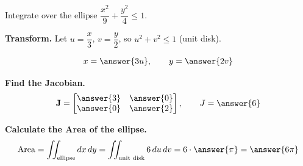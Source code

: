 \documentclass{ximera}
\begin{document}
\begin{problem}
Integrate over the ellipse $\dfrac{x^2}{9} + \dfrac{y^2}{4} \leq 1$.

\textbf{Transform.}  Let $u = \dfrac{x}{3}$, $v = \dfrac{y}{2}$, so $u^2+v^2 \leq 1$ (unit disk).

$$x = \answer{3u}, \qquad y = \answer{2v}$$

\textbf{Find the Jacobian.}
$$\mathbf{J} = \begin{bmatrix} \answer{3} & \answer{0} \\ \answer{0} & \answer{2} \end{bmatrix}, \qquad J = \answer{6}$$

\textbf{Calculate the Area of the ellipse.}
$$\text{Area} = \iint_{\text{ellipse}} dx\,dy = \iint_{\text{unit disk}} 6\,du\,dv = 6 \cdot \answer{\pi} = \answer{6\pi}$$

\end{problem}
\end{document}
